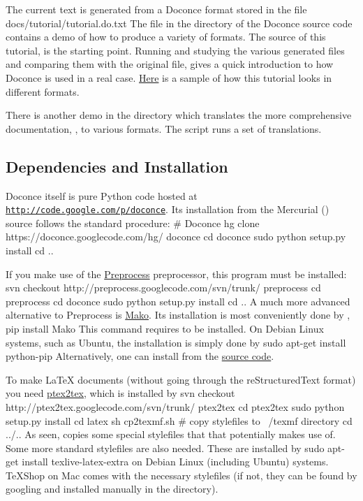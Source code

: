 \documentclass{book}
\begin{document}
The current text is generated from a Doconce format stored in the file
\bccq
docs/tutorial/tutorial.do.txt
\eccq
The file  in the  directory of the
Doconce source code contains a demo of how to produce a variety of
formats.  The source of this tutorial,  is the
starting point.  Running  and studying the various generated
files and comparing them with the original  file,
gives a quick introduction to how Doconce is used in a real case.
\href{{https://doconce.googlecode.com/hg/doc/demos/tutorial/index.html}}{Here}
is a sample of how this tutorial looks in different formats.

There is another demo in the  directory which
translates the more comprehensive documentation, , to
various formats. The  script runs a set of translations.

\subsection{Dependencies and Installation}

Doconce itself is pure Python code hosted at \href{{http://code.google.com/p/doconce}}{\nolinkurl{http://code.google.com/p/doconce}}.  Its installation from the
Mercurial () source follows the standard procedure:
\bsys
# Doconce
hg clone https://doconce.googlecode.com/hg/ doconce
cd doconce
sudo python setup.py install
cd ..
\esys

If you make use of the \href{{http://code.google.com/p/preprocess}}{Preprocess}
preprocessor, this program must be installed:
\bsys
svn checkout http://preprocess.googlecode.com/svn/trunk/ preprocess
cd preprocess
cd doconce
sudo python setup.py install
cd ..
\esys
A much more advanced alternative to Preprocess is
\href{{http://www.makotemplates.org}}{Mako}. Its installation is most
conveniently done by ,
\bsys
pip install Mako
\esys
This command requires  to be installed. On Debian Linux systems,
such as Ubuntu, the installation is simply done by
\bsys
sudo apt-get install python-pip
\esys
Alternatively, one can install from the  \href{{http://pypi.python.org/pypi/pip}}{source code}.

To make {\LaTeX}
documents (without going through the reStructuredText format) you
need \href{{http://code.google.com/p/ptex2tex}}{ptex2tex}, which is
installed by
\bsys
svn checkout http://ptex2tex.googlecode.com/svn/trunk/ ptex2tex
cd ptex2tex
sudo python setup.py install
cd latex
sh cp2texmf.sh  # copy stylefiles to ~/texmf directory
cd ../..
\esys
As seen,  copies some special stylefiles that
that  potentially makes use of. Some more standard stylefiles
are also needed. These are installed by
\bsys
sudo apt-get install texlive-latex-extra
\esys
on Debian Linux (including Ubuntu) systems. TeXShop on Mac comes with
the necessary stylefiles (if not, they can be found by googling and installed
manually in the  directory).
\end{document}
